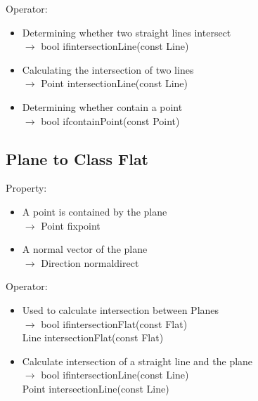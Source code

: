 \documentclass[a4paper]{book}
\numberwithin{equation}{chapter}
\theoremstyle{definition}
\begin{document}
\begin{multicols}{2}
\begin{itemize}
\end{itemize}

Operator:
\begin{itemize}
	\item Determining whether two straight lines intersect \\
	$ \longrightarrow $ bool ifintersectionLine(const Line)
	
	\item Calculating the intersection of two lines \\
	$ \longrightarrow $ Point intersectionLine(const Line)
	
	\item Determining whether contain a point \\
	$ \longrightarrow $ bool ifcontainPoint(const Point)
	
\end{itemize}

\subsection{Plane to Class Flat}

Property:
\begin{itemize}
	\item A point is contained by the plane \\
	$ \longrightarrow $ Point fixpoint 
	
	\item A normal vector of the plane \\
	$ \longrightarrow $ Direction normaldirect
	
\end{itemize}

Operator:
\begin{itemize}
	\item Used to calculate intersection between Planes \\
	$ \longrightarrow $ bool ifintersectionFlat(const Flat)
	\\ Line intersectionFlat(const Flat)
	
	\item Calculate intersection of a straight line and the plane \\
	$ \longrightarrow $ bool ifintersectionLine(const Line) \\ Point intersectionLine(const Line)
	

\end{itemize}




%


\end{multicols}
\end{document}
